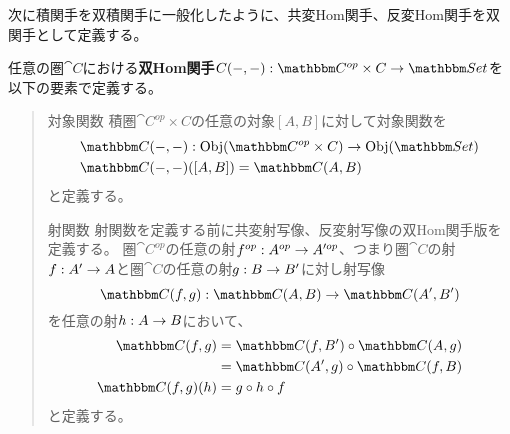 	次に積関手を双積関手に一般化したように、共変Hom関手、反変Hom関手を双関手として定義する。
	\begin{define}[双Hom関手]\label{def-dihom-functor}
		任意の圏$\cat{C}$における\textbf{双Hom関手}$\functor{C(-,-)}{C^{op}\times C}{Set}$を以下の要素で定義する。
		\begin{quote}
			\begin{mydescription}
				\item[対象関数] 積圏$\cat{C^{op}\times C}$の任意の対象$[A,B]$に対して対象関数を
				\begin{align*}
					&\mor{\arset{C}{-}{-}}{\obj{C^{op}\times C}}{\obj{Set}}\\
					&\arset{C}{-}{-}([A,B])=\arset{C}{A}{B}
				\end{align*}
				と定義する。
				\item[射関数]射関数を定義する前に共変射写像、反変射写像の双Hom関手版を定義する。
				圏$\cat{C^{op}}$の任意の射$f^{op}:A^{op}\rightarrow A'^{op}$、つまり圏$\cat{C}$の射$f:A'\rightarrow A$と圏$\cat{C}$の任意の射$g:B\rightarrow B'$に対し射写像\[\mor{\arset{C}{f}{g}}{\arset{C}{A}{B}}{\arset{C}{A'}{B'}}\]を任意の射$h:A\rightarrow B$において、
				\begin{align*}
					\arset{C}{f}{g}&=\arset{C}{f}{B'}\circ\arset{C}{A}{g}\\
					&=\arset{C}{A'}{g}\circ\arset{C}{f}{B}\\
					\arset{C}{f}{g}(h)&=g\circ h\circ f\\
				\end{align*}
				と定義する。

				\begin{center}
				\end{center}


\end{mydescription}
\end{quote}
\end{define}

